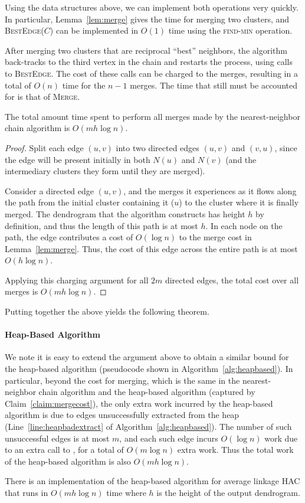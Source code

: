Using the data structures above, we can implement both operations very quickly. 
In particular, Lemma~\ref{lem:merge} gives the time for merging two clusters, and \textsc{BestEdge}($C$) can be implemented in $O(1)$ time using the \textsc{find-min} operation.

After merging two clusters that are reciprocal ``best'' neighbors, the algorithm back-tracks to the third vertex in the chain and restarts the process, using calls to \textsc{BestEdge}.
The cost of these calls can be charged to the merges, resulting in a total of $O(n)$ time for the $n-1$ merges.
The time that still must be accounted for is that of \textsc{Merge}.

\begin{claim}\label{claim:mergecost}
The total amount time spent to perform all merges made by the nearest-neighbor chain algorithm is $O(mh\log n)$.
\end{claim}
\begin{proof}
Split each edge $(u,v)$ into two directed edges $(u,v)$ and $(v,u)$, since the edge will be present initially in both $N(u)$ and $N(v)$ (and the intermediary clusters they form until they are merged).

Consider a directed edge $(u,v)$, and the merges it experiences as it flows along the path from the initial cluster containing it ($u$) to the cluster where it is finally merged.
The dendrogram that the algorithm constructs has height $h$ by definition, and thus the length of this path is at most $h$.
In each node on the path, the edge contributes a cost of $O(\log n)$ to the merge cost in Lemma~\ref{lem:merge}.
Thus, the cost of this edge across the entire path is at most $O(h \log n)$.

Applying this charging argument for all $2m$ directed edges, the total cost over all merges is $O(mh\log n)$.
\end{proof}


Putting together the above yields the following theorem.
\mainUpperSec*



\paragraph{Heap-Based Algorithm}

We note it is easy to extend the argument above to obtain a similar bound for the heap-based algorithm 
(pseudocode shown in Algorithm~\ref{alg:heapbased}).
In particular, beyond the cost for merging, which is the same in the nearest-neighbor chain algorithm and the heap-based algorithm (captured by Claim~\ref{claim:mergecost}), the only extra work incurred by the heap-based algorithm is due to edges unsuccessfully extracted from the heap (Line~\ref{line:heapbadextract} of Algorithm~\ref{alg:heapbased}). 
The number of such unsuccessful edges is at most $m$, and each such edge incurs $O(\log n)$ work due to an extra call to , for a total of $O(m\log n)$ extra work.
Thus the total work of the heap-based algorithm is also $O(mh\log n)$.

\begin{theorem}
There is an implementation of the heap-based algorithm for average linkage HAC that runs in $O(mh \log n)$ time where $h$ is the height of the output dendrogram.
\end{theorem}






